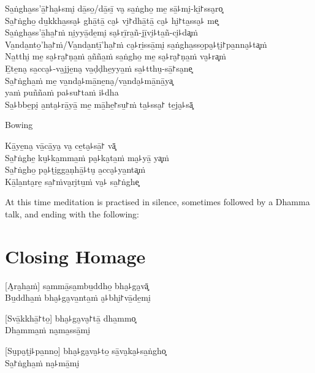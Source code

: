 \enlargethispage{\baselineskip}
\clearpage

Sa̱ṅgha̱ss'ā̱꜓ha̱꜕smi̮ dā̱so̱/dā̱sī̱ va̮ sa̱ṅgho̱ me̱ sā̱꜕mi̮-ki̱꜓ssa̮ro͓\\
Sa̱꜓ṅgho̱ du̱kkha̱ssa̮꜕ ghā̱tā̱ ca̮꜕ vi̮꜓dhā̱tā̱ ca̮꜕ hi̮꜓ta̱ssa̮꜕ me͓\\
Sa̱ṅgha̱ss'ā̱ha̱꜓ṁ ni̱yyā̱de̱mi̮ sa̮꜕rī̱ra̱ñ-jī̱vi̮꜕ta̱ñ-ci̮꜕da͓ṁ\\
Va̱nda̱nto̱'ha̱꜓ṁ/Va̱nda̱ntī̱'ha̱꜓ṁ ca̮꜕ri̱ssā̱mi̮ sa̱ṅgha̱sso̱pa̮꜕ṭi̮꜓pa̱nna̮꜕ta͓ṁ\\
Na̱tthi̮ me̱ sa̮꜕ra̮꜓ṇa̱ṁ a̱ñña̱ṁ sa̱ṅgho̱ me̱ sa̮꜕ra̮꜓ṇa̱ṁ va̮꜕ra͓ṁ\\
E̱te̱na̮ sa̱cca̮꜕-va̱jje̱na̮ va̱ḍḍhe̱yya̱ṁ sa̱꜕tthu̮-sā̱꜓sa̮ne͓\\
Sa̱꜓ṅgha̱ṁ me̱ va̱nda̮꜕mā̱ne̱na̮/va̱nda̮꜕mā̱nā̱ya͓\\
\vin yaṁ puññaṁ pa꜕su꜓taṁ i꜕dha\\
Sa̱꜕bbe̱pi̮ a̱nta̮꜕rā̱yā̱ me̱ mā̱he̱꜓su̱꜓ṁ ta̱꜕ssa̮꜓ te̱ja̮꜕sā͓

\begin{instruction}
  Bowing
\end{instruction}

Kā̱ye̱na̮ vā̱cā̱ya̮ va̮ ce̱ta̮꜕sā̱꜓ vā͓\\
Sa̱꜓ṅghe̱ ku̮꜕ka̱mma̱ṁ pa̮꜕ka̮ta̱ṁ ma̮꜕yā̱ ya͓ṁ\\
Sa̱꜓ṅgho̱ pa̮꜕ṭi̱gga̱ṇhā̱꜕tu̮ a̱cca̮꜕ya̱nta͓ṁ\\
Kā̱la̱nta̮re̱ sa̱꜓ṁva̮ri̮tu̱ṁ va̮꜕ sa̱꜓ṅghe͓

\vfill

\begin{instruction}
  At this time meditation is practised in silence, sometimes followed by a Dhamma talk, and ending with the following:
\end{instruction}

\chapter*{Closing Homage}

\delegateSetUseNext

[A̮ra̮ha̱ṁ] sa̱mmā̱sa̱mbu̱ddho̱ bha̮꜕ga̮vā͓\\
Bu̱ddha̱ṁ bha̮꜕ga̮va̱nta̱ṁ a̮꜕bhi̮꜓vā̱de̱mi̮ 

[Svā̱kkhā̱꜓to̱] bha̮꜕ga̮va̮꜓tā̱ dha̱mmo͓\\
Dha̱mma̱ṁ na̮ma̱ssā̱mi̮ 

[Su̮pa̮ṭi̮꜕pa̱nno̱] bha̮꜕ga̮va̮꜕to̱ sā̱va̮ka̮꜕sa̱ṅgho͓\\
Sa̱꜓ṅgha̱ṁ na̮꜕mā̱mi̮ 

